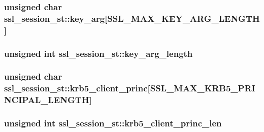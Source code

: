 \hypertarget{structssl__session__st_a5f697ed1d136a066dcaa054a5aca54d5}{
\subsubsection[{key\-\_\-arg}]{\setlength{\rightskip}{0pt plus 5cm}unsigned char ssl\-\_\-session\-\_\-st\-::key\-\_\-arg\mbox{[}{\bf S\-S\-L\-\_\-\-M\-A\-X\-\_\-\-K\-E\-Y\-\_\-\-A\-R\-G\-\_\-\-L\-E\-N\-G\-T\-H}\mbox{]}}}\label{structssl__session__st_a5f697ed1d136a066dcaa054a5aca54d5}
\hypertarget{structssl__session__st_aa59c33cbe59e8aa9fd097d2034665935}{
\subsubsection[{key\-\_\-arg\-\_\-length}]{\setlength{\rightskip}{0pt plus 5cm}unsigned int ssl\-\_\-session\-\_\-st\-::key\-\_\-arg\-\_\-length}}\label{structssl__session__st_aa59c33cbe59e8aa9fd097d2034665935}
\hypertarget{structssl__session__st_a0b4981b6ae2db5a19c054026c354c062}{
\subsubsection[{krb5\-\_\-client\-\_\-princ}]{\setlength{\rightskip}{0pt plus 5cm}unsigned char ssl\-\_\-session\-\_\-st\-::krb5\-\_\-client\-\_\-princ\mbox{[}{\bf S\-S\-L\-\_\-\-M\-A\-X\-\_\-\-K\-R\-B5\-\_\-\-P\-R\-I\-N\-C\-I\-P\-A\-L\-\_\-\-L\-E\-N\-G\-T\-H}\mbox{]}}}\label{structssl__session__st_a0b4981b6ae2db5a19c054026c354c062}
\hypertarget{structssl__session__st_ab87e9ec7a53c471d4f98d0479f48fc01}{
\subsubsection[{krb5\-\_\-client\-\_\-princ\-\_\-len}]{\setlength{\rightskip}{0pt plus 5cm}unsigned int ssl\-\_\-session\-\_\-st\-::krb5\-\_\-client\-\_\-princ\-\_\-len}}\label{structssl__session__st_ab87e9ec7a53c471d4f98d0479f48fc01}
